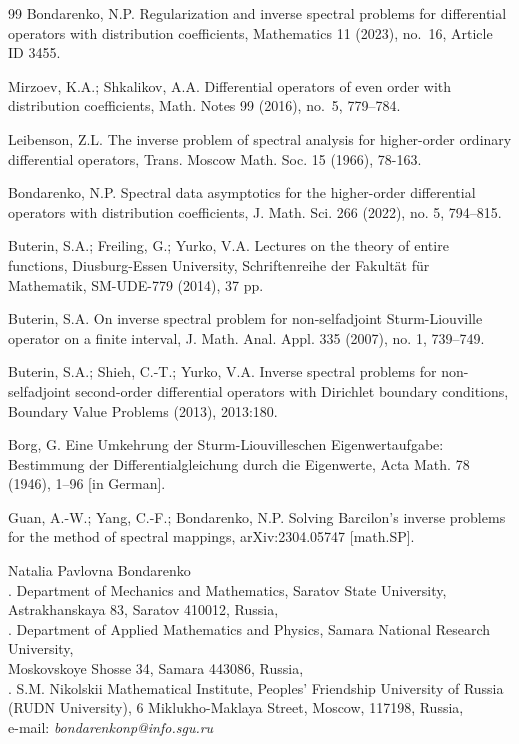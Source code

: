 \documentclass[a4paper,12pt]{article}
\theoremstyle{plain}
\numberwithin{equation}{section}
\theoremstyle{definition}
\theoremstyle{remark}
\begin{document}
\begin{thebibliography}{99}
Bondarenko, N.P. Regularization and inverse spectral problems for differential operators with distribution coefficients, Mathematics 11 (2023), no.~16, Article ID 3455.

Mirzoev, K.A.; Shkalikov, A.A. Differential operators of even order with distribution coefficients, Math. Notes 99 (2016), no.~5, 779--784.

Leibenson, Z.L. The inverse problem of spectral analysis for higher-order ordinary differential operators, Trans. Moscow Math. Soc. 15 (1966), 78-163.

Bondarenko, N.P. Spectral data asymptotics for the higher-order differential operators with distribution coefficients, J. Math. Sci. 266 (2022), no. 5, 794--815.

Buterin, S.A.; Freiling, G.; Yurko, V.A. Lectures on the theory of entire functions, Diusburg-Essen University, Schriftenreihe der Fakult\"at f\"ur Mathematik, SM-UDE-779 (2014), 37 pp.


Buterin, S.A. On inverse spectral problem for non-selfadjoint Sturm-Liouville operator on a finite interval, J. Math. Anal. Appl. 335 (2007), no. 1, 739--749.

Buterin, S.A.; Shieh, C.-T.; Yurko, V.A. Inverse spectral problems for non-selfadjoint second-order differential operators with Dirichlet boundary conditions, Boundary Value Problems (2013), 2013:180.

Borg, G. Eine Umkehrung der Sturm-Liouvilleschen Eigenwertaufgabe: Bestimmung der Differentialgleichung durch die Eigenwerte, Acta Math. 78 (1946), 1--96 [in German].

Guan, A.-W.; Yang, C.-F.; Bondarenko, N.P. Solving Barcilon's inverse problems for the method of spectral mappings, arXiv:2304.05747 [math.SP].

\end{thebibliography}

\noindent Natalia Pavlovna Bondarenko \\

. Department of Mechanics and Mathematics, Saratov State University, \\
Astrakhanskaya 83, Saratov 410012, Russia, \\

. Department of Applied Mathematics and Physics, Samara National Research University, \\
Moskovskoye Shosse 34, Samara 443086, Russia, \\

. S.M. Nikolskii Mathematical Institute, Peoples' Friendship University of Russia (RUDN University), 6 Miklukho-Maklaya Street, Moscow, 117198, Russia, \\

\noindent e-mail: {\it bondarenkonp@info.sgu.ru}
\end{document}

